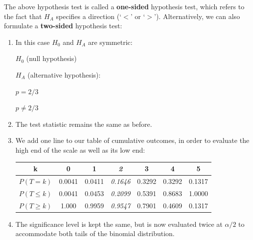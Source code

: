 The above hypothesis test is called a \textbf{one-sided} hypothesis
test, which refers to the fact that $H_{\!A}$ specifies a direction
(`$<$' or `$>$').  Alternatively, we can also formulate a
\textbf{two-sided} hypothesis test:

\begin{enumerate}

\item In this case $H_0$ and $H_{\!A}$ are symmetric:\medskip

\noindent\begin{minipage}{.4\textwidth}
  $H_0$ (null hypothesis)
  
  \vspace{1em}
  
  $H_{\!A}$ (alternative hypothesis):
\end{minipage}
\begin{minipage}{.2\textwidth}
\end{minipage}
\begin{minipage}{.2\textwidth}
  $p=2/3$
  
  \vspace{1em}
  
  ${p}\neq{2/3}$
\end{minipage}
\begin{minipage}{.2\textwidth}
\end{minipage}\medskip

\item The test statistic remains the same as before.

\item We add one line to our table of cumulative outcomes, in order to
  evaluate the high end of the scale as well as its low end:

  \begin{center}
    \begin{tabular}{ccccccc}
      k & 0 & 1 & \textit{2} & 3 & 4 & 5 \\ \hline
      $P(T=k)$ & 0.0041 & 0.0411 & \textit{0.1646} & 0.3292 & 0.3292 & 0.1317 \\
      $P({T}\leq{k})$ & 0.0041 & 0.0453 & \textit{0.2099} &
      0.5391 & 0.8683 & 1.0000 \\
      $P({T}\geq{k})$ & 1.000 & 0.9959 & \textit{0.9547} &
      0.7901 & 0.4609 & 0.1317
    \end{tabular}
  \end{center}
  
\item The significance level is kept the same, but is now evaluated
  twice at $\alpha/2$ to accommodate both tails of the binomial
  distribution.


\end{enumerate}

